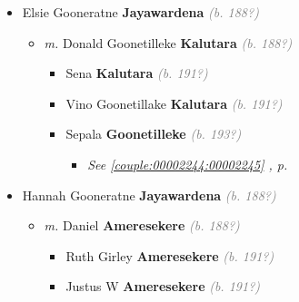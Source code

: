 \documentclass[10pt, openany]{book}
\begin{document}
\begin{itemize}
{\begin{itemize}
{\begin{itemize}
{\begin{itemize}
{\begin{itemize}
{\begin{itemize}
\item{Rushika  US \textbf{Ranasinghe} \textcolor{gray}{\textit{(b. 195?)}}
  }
\item{Nilani  US \textbf{Ranasinghe} \textcolor{gray}{\textit{(b. 195?)}}
  }
\end{itemize}}
\end{itemize}
 }
\end{itemize}}
\end{itemize}
  }
\item{Elsie Gooneratne \textbf{Jayawardena} \textcolor{gray}{\textit{(b. 188?)}}
\begin{itemize}
\item{\textit{m.} Donald Goonetilleke \textbf{Kalutara} \textcolor{gray}{\textit{(b. 188?)}}   \label{couple:00003169:00003170} \begin{itemize}
\item{Sena \textbf{Kalutara} \textcolor{gray}{\textit{(b. 191?)}}
 }
\item{Vino Goonetillake \textbf{Kalutara} \textcolor{gray}{\textit{(b. 191?)}}
  }
\item{Sepala \textbf{Goonetilleke} \textcolor{gray}{\textit{(b. 193?)}}
\begin{itemize}
\item{\textcolor{slteal}{\textit{See  \autoref{couple:00002244:00002245} \textit{, p. \pageref{couple:00002244:00002245} }}}}
\end{itemize}
 }
\end{itemize}}
\end{itemize}
  }
\item{Hannah Gooneratne \textbf{Jayawardena} \textcolor{gray}{\textit{(b. 188?)}}
\begin{itemize}
\item{\textit{m.} Daniel \textbf{Ameresekere} \textcolor{gray}{\textit{(b. 188?)}}   \label{couple:00003131:00003132} \begin{itemize}
\item{Ruth Girley  \textbf{Ameresekere} \textcolor{gray}{\textit{(b. 191?)}}
  }
\item{Justus W  \textbf{Ameresekere} \textcolor{gray}{\textit{(b. 191?)}}
\begin{itemize}

\end{itemize}}
\end{itemize}}
\end{itemize}}
\end{itemize}}
\end{itemize}
\end{document}
